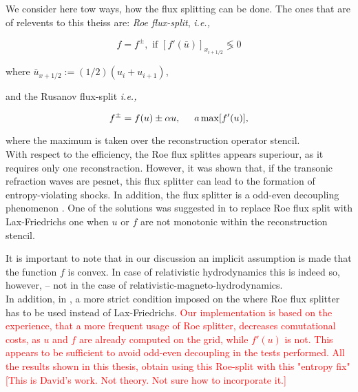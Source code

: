 \documentclass[11pt,a4paper,headinclude=true,DIV=14,BCOR=8mm,chapterprefix,listof=totoc,twoside,openright,abstracton]{scrbook}
\begin{document}
We consider here tow ways, how the flux splitting can be done. The ones that are of relevents to this theiss are: \textit{Roe flux-split}, \textit{i.e.,}

\begin{equation}
    f = f^{\pm}, \text{  if  } [f'(\bar{u})]_{x_{i+1/2}} \lessgtr 0
    \label{eq:theory:fd:roefluxsplit}
\end{equation}

where $\bar{u}_{x+1/2} := (1/2) (u_i + u_{i+1})$, 

and the Rusanov flux-split \cite{Shu:1997} \textit{i.e.,}

\begin{equation}
    f^{\pm} = f(u) \pm \alpha u, \hspace{5mm} a \max[f'(u)],
    \label{eq:theory:fd:laxfluxsplit}
\end{equation}

where the maximum is taken over the reconstruction operator stencil. \\ 

With respect to the efficiency, the Roe flux splittes appears superiour, as it requires only one reconstraction. However, it was shown \cite{LeVeque:1992} that, if the transonic refraction waves are pesnet, this flux splitter can lead to the formation of entropy-violating shocks. In addition, the flux splitter is a odd-even decoupling phenomenon \cite{Quirk:1994}. One of the solutions was suggested in \cite{Radice:2012cu} to replace Roe flux split with Lax-Friedrichs one when $u$ or $f$ are not monotonic within the reconstruction stencil. 

It is important to note that in our discussion an implicit assumption is made that the function $f$ is convex. In case of relativistic hydrodynamics this is indeed so, however, -- not in the case of relativistic-magneto-hydrodynamics. \\

In addition, in \cite{LeVeque:1992}, a more strict condition imposed on the where Roe flux splitter has to be used instead of Lax-Friedrichs. \textcolor{red}{Our implementation is based on the experience, that a more frequent usage of Roe splitter, decreases comutational costs, as $u$ and $f$ are already computed on the grid, while $f'(u)$ is not. This appears to be sufficient to avoid odd-even decoupling in the tests performed. All the results shown in this thesis, obtain using this Roe-split with this "entropy fix" [This is David's work. Not theory. Not sure how to incorporate it.]} \\
\end{document}
